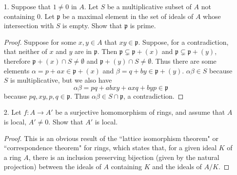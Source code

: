 \documentclass[10pt]{article}
\newcommand{\p}{\mathfrak{p}}
\begin{document}
\begin{enumerate}
\begin{enumerate}
\begin{proof}
Now,
$$
(\mu * \varphi_1)(1) = \sum_{xy = 1} \mu(1)\varphi_1(1) = 1 = \delta(1)
$$
and for any prime $p$ we have
$$
(\mu * \varphi_1)(p) = \sum_{xy = p} \mu(x)\varphi_1(y) = \mu(1)\varphi_1(p) + \mu(p)\varphi_1(1) = 1 + (-1) = 0.
$$

Therefore, if $m > 1$ then $m$ is divisible by some prime $p$, thus
$$
\left(\mu * \varphi_1\right)\left(m\right) = \left(\mu * \varphi_1\right)\left(p\right) \left(\mu * \varphi_1\right)\left(\frac{m}{p}\right) = 0 \cdot \left(\mu * \varphi_1\right)\left(\frac{m}{p}\right) = 0 = \delta(m).
$$
So $\mu * \varphi_1 = \delta$.

In this language, the M\"obius inversion formula simply states, ``For any $f, g \in R$, $f = g * \varphi_1$ if and only if $g = f * \mu$."  This is equivalent to saying, ``For any $f \in R$, $f = (f * \mu) * \varphi_1 $."  But since $*$ is commutative and associative, this reduces to $\mu * \varphi_1 * f = f$.  But we have just shown that $\mu * \varphi = \delta$ is the identity, which proves the M\"obius inversion formula.
\end{proof}

\end{enumerate}

\item[1.] Suppose that $1 \neq 0$ in $A$.  Let $S$ be a multiplicative subset of $A$ not containing $0$.  Let $\p$ be a maximal element in the set of ideals of $A$ whose intersection with $S$ is empty.  Show that $\p$ is prime.

\begin{proof}
Suppose for some $x,y \in A$ that $xy \in \p$.  Suppose, for a contradiction, that neither of $x$ and $y$ are in $\p$.  Then $\p \subsetneq \p + (x)$ and $\p \subsetneq \p + (y)$, therefore $\p + (x) \cap S \neq \emptyset$ and $\p + (y) \cap S \neq \emptyset$.  Thus there are some elements $\alpha = p + ax \in \p + (x)$ and $\beta = q + by \in \p + (y)$.  $\alpha \beta \in S$ because $S$ is multiplicative, but we also have
$$
\alpha \beta = pq + abxy + axq + byp \in \p
$$
because $pq, xy, p, q \in \p$.  Thus $\alpha \beta \in S \cap \p$, a contradiction.
\end{proof}

\item[2.] Let $f : A \rightarrow A'$ be a surjective homomorphism of rings, and assume that $A$ is local, $A' \neq 0$.  Show that $A'$ is local.

\begin{proof}
This is an obvious result of the ``lattice isomorphism theorem" or ``correspondence theorem" for rings, which states that, for a given ideal $K$ of a ring $A$, there is an inclusion preserving bijection (given by the natural projection) between the ideals of $A$ containing $K$ and the ideals of $A / K$.


\end{proof}
\end{enumerate}
\end{document}
